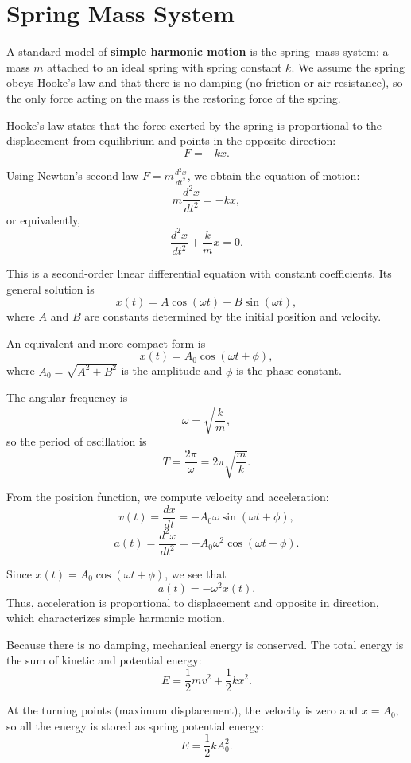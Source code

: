 \documentclass[11pt]{article}
\begin{document}
\section{Spring Mass System}
   A standard model of \textbf{simple harmonic motion} is the spring--mass system: a mass $m$ attached to an ideal spring with spring constant $k$. We assume the spring obeys Hooke’s law and that there is no damping (no friction or air resistance), so the only force acting on the mass is the restoring force of the spring.
   
   Hooke’s law states that the force exerted by the spring is proportional to the displacement from equilibrium and points in the opposite direction:
   \[
   F = -kx.
   \]
   
   Using Newton’s second law $F = m\frac{d^2x}{dt^2}$, we obtain the equation of motion:
   \[
   m\frac{d^2x}{dt^2} = -kx,
   \]
   or equivalently,
   \[
   \frac{d^2x}{dt^2} + \frac{k}{m}x = 0.
   \]
   
   This is a second-order linear differential equation with constant coefficients. Its general solution is
   \[
   x(t) = A\cos(\omega t) + B\sin(\omega t),
   \]
   where $A$ and $B$ are constants determined by the initial position and velocity.
   
   An equivalent and more compact form is
   \[
   x(t) = A_0 \cos(\omega t + \phi),
   \]
   where $A_0 = \sqrt{A^2 + B^2}$ is the amplitude and $\phi$ is the phase constant.
   
   The angular frequency is
   \[
   \omega = \sqrt{\frac{k}{m}},
   \]
   so the period of oscillation is
   \[
   T = \frac{2\pi}{\omega} = 2\pi\sqrt{\frac{m}{k}}.
   \]
   
   From the position function, we compute velocity and acceleration:
   \[
   v(t) = \frac{dx}{dt} = -A_0 \omega \sin(\omega t + \phi),
   \]
   \[
   a(t) = \frac{d^2x}{dt^2} = -A_0 \omega^2 \cos(\omega t + \phi).
   \]
   
   Since $x(t) = A_0 \cos(\omega t + \phi)$, we see that
   \[
   a(t) = -\omega^2 x(t).
   \]
   Thus, acceleration is proportional to displacement and opposite in direction, which characterizes simple harmonic motion.
   
   Because there is no damping, mechanical energy is conserved. The total energy is the sum of kinetic and potential energy:
   \[
   E = \frac{1}{2}mv^2 + \frac{1}{2}kx^2.
   \]
   
   At the turning points (maximum displacement), the velocity is zero and $x = A_0$, so all the energy is stored as spring potential energy:
   \[
   E = \frac{1}{2}kA_0^2.
   \]
   
\end{document}
